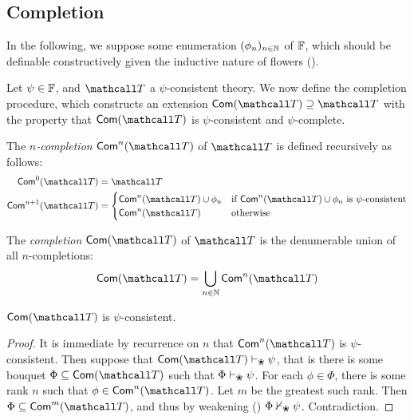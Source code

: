 
\subsection{Completion}

In the following, we suppose some enumeration $(\phi_n)_{n \in \mathbb{N}}$ of
$\mathbb{F}$, which should be definable constructively given the
inductive nature of flowers ().

Let $\psi \in \mathbb{F}$, and $\tT$ a $\psi$-consistent theory. We now define the
completion procedure, which constructs an extension $\completion{\tT} \supseteq
\tT$ with the property that $\completion{\tT}$ is $\psi$-consistent and
$\psi$-complete.

\begin{definition}[$n$-completion]
  The \emph{$n$-completion} $\ncompletion{\tT}{n}$ of $\tT$ is defined recursively
  as follows:
  \begin{align*}
    \ncompletion{\tT}{0} &= \tT \\
    \ncompletion{\tT}{n+1} &=
    \begin{cases}
      \ncompletion{\tT}{n} \cup \phi_n &\text{if $\ncompletion{\tT}{n} \cup \phi_n$ is $\psi$-consistent} \\
      \ncompletion{\tT}{n} &\text{otherwise}
    \end{cases}
  \end{align*}
\end{definition}

\begin{definition}[Completion]
  The \emph{completion} $\completion{\tT}$ of $\tT$ is the denumerable union of all
  $n$-completions:
  $$\completion{\tT} = \bigcup_{n \in \nats}{\ncompletion{\tT}{n}}$$
\end{definition}

\begin{lemma}
  $\completion{\tT}$ is $\psi$-consistent.
\end{lemma}
\begin{proof}
  It is immediate by recurrence on $n$ that $\ncompletion{\tT}{n}$ is
  $\psi$-consistent. Then suppose that $\completion{\tT} \vdash_\Nature \psi$,
  that is there is some bouquet $\Phi \subseteq \completion{\tT}$ such that $\Phi
  \vdash_\Nature \psi$. For each $\phi \in \Phi$, there is some rank $n$ such
  that $\phi \in \ncompletion{\tT}{n}$. Let $m$ be the greatest such rank. Then
  $\Phi \subseteq \ncompletion{\tT}{m}$, and thus by weakening
  () $\Phi \nvdash_\Nature \psi$. Contradiction.
\end{proof}



